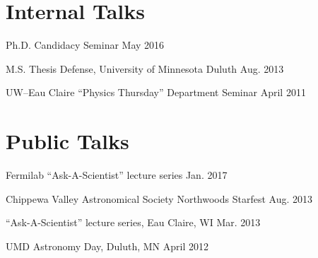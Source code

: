 \documentclass[11pt]{cv}
\begin{document}
\begin{cv}
\section{Internal Talks}
\begin{etaremune}
  \item Ph.D. Candidacy Seminar \hfill May 2016
  \item M.S. Thesis Defense, University of Minnesota Duluth \hfill Aug. 2013
  \item UW--Eau Claire ``Physics Thursday'' Department Seminar \hfill April 2011
\end{etaremune}


\section{Public Talks}
\begin{etaremune}
  \item Fermilab ``Ask-A-Scientist'' lecture series \hfill Jan. 2017
  \item Chippewa Valley Astronomical Society Northwoods Starfest \hfill Aug. 2013
  \item ``Ask-A-Scientist'' lecture series, Eau Claire, WI \hfill Mar. 2013
  \item UMD Astronomy Day, Duluth, MN \hfill April 2012
\end{etaremune}



\end{cv}
\end{document}
